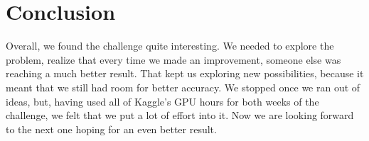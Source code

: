 \documentclass[a4paper,12pt]{article}
\numberwithin{equation}{section}
\begin{document}
\section*{Conclusion}
Overall, we found the challenge quite interesting. We needed to explore the problem, realize that every time we made an improvement, someone else was reaching a much better result. That kept us exploring new possibilities, because it meant that we still had room for better accuracy. We stopped once we ran out of ideas, but, having used all of Kaggle's GPU hours for both weeks of the challenge, we felt that we put a lot of effort into it. Now we are looking forward to the next one hoping for an even better result.
\end{document}
